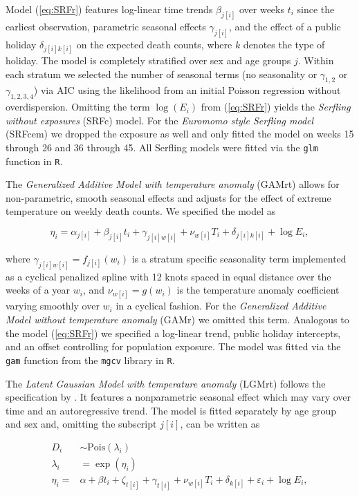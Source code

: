 \documentclass[12pt]{article}
\begin{document}
Model (\ref{eq:SRFr}) features log-linear time trends $\beta_{j[i]}$ over weeks $t_i$ since the earliest observation, parametric seasonal effects $\gamma_{j[i]}$, and the effect of a public holiday $\delta_{j[i]k[i]}$ on the expected death counts, where $k$ denotes the type of holiday. The model is completely stratified over sex and age groups $j$. Within each stratum we selected the number of seasonal terms (no seasonality or $\gamma_{1,2}$ or $\gamma_{1,2,3,4}$) via AIC using the likelihood from an initial Poisson regression without overdispersion. Omitting the term $\log(E_i)$ from (\ref{eq:SRFr}) yields the \emph{Serfling without exposures} (SRFc) model. For the \emph{Euromomo style Serfling model} (SRFcem) we dropped the exposure as well and only fitted the model on weeks 15 through 26 and 36 through 45. All Serfling models were fitted via the \texttt{glm} function in \texttt{R}.

The \emph{Generalized Additive Model with temperature anomaly} (GAMrt) allows for non-parametric, smooth seasonal effects and adjusts for the effect of extreme temperature on weekly death counts. We specified the model as

\begin{equation}
  \eta_i = \alpha_{j[i]} + \beta_{j[i]}t_i + \gamma_{j[i]w[i]} + \nu_{w[i]} T_i + \delta_{j[i]k[i]} + \log E_i,
  \label{eq:GAMrt}
\end{equation}

where $\gamma_{j[i]w[i]} = f_{j[i]}(w_i)$ is a stratum specific seasonality term implemented as a cyclical penalized spline with 12 knots spaced in equal distance over the weeks of a year $w_i$, and $\nu_{w[i]}=g(w_i)$ is the temperature anomaly coefficient varying smoothly over $w_i$ in a cyclical fashion. For the \emph{Generalized Additive Model without temperature anomaly} (GAMr) we omitted this term. Analogous to the model (\ref{eq:SRFr}) we specified a log-linear trend, public holiday intercepts, and an offset controlling for population exposure. The model was fitted via the \texttt{gam} function from the \texttt{mgcv} library in \texttt{R}.

The \emph{Latent Gaussian Model with temperature anomaly} (LGMrt) follows the specification by \cite{Kontis2020}. It features a nonparametric seasonal effect which may vary over time and an autoregressive trend. The model is fitted separately by age group and sex and, omitting the subscript $j[i]$, can be written as

\begin{equation}
  \begin{aligned}
    D_i &\sim \text{Pois}(\lambda_i) \\
    \lambda_i &= \exp(\eta_i) \\
    \eta_i =& \alpha + \beta t_i +
    \zeta_{t[i]} + \gamma_{t[i]} +
    \nu_{w[i]} T_i + \delta_{k[i]} + \varepsilon_i + \log E_i,
  \end{aligned}
  \label{eq:LGMrt}
\end{equation}
\end{document}
